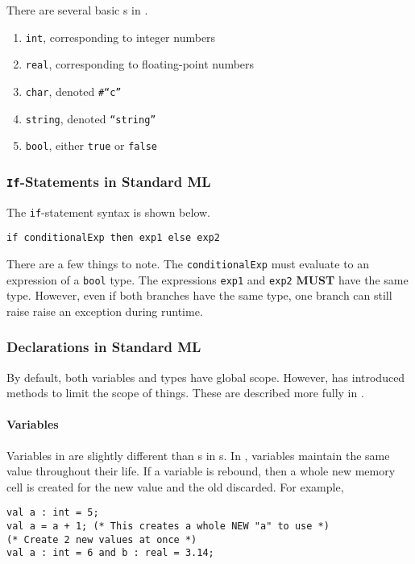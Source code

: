 There are several basic s in .
\begin{enumerate}[noitemsep]
\item \texttt{int}, corresponding to integer numbers
\item \texttt{real}, corresponding to floating-point numbers
\item \texttt{char}, denoted \texttt{\#``c''}
\item \texttt{string}, denoted \texttt{``string''}
\item \texttt{bool}, either \texttt{true} or \texttt{false}
\end{enumerate}

\subsubsection{\texttt{If}-Statements in Standard ML}\label{subsubsec:Functional-SML-If_Statement}
The \texttt{if}-statement syntax is shown below.
\begin{verbatim}
if conditionalExp then exp1 else exp2
\end{verbatim}

There are a few things to note.
The \texttt{conditionalExp} must evaluate to an expression of a \texttt{bool} type.
The expressions \texttt{exp1} and \texttt{exp2} \textbf{MUST} have the same type.
However, even if both branches have the same type, one branch can still raise raise an exception during runtime.

\subsubsection{Declarations in Standard ML}\label{subsubsec:Functional-SML-Declarations}
By default, both variables and types have global scope.
However,  has introduced methods to limit the scope of things.
These are described more fully in .

\paragraph{Variables}\label{par:Functional-SML-Variable_Declarations}
Variables in  are slightly different than s in s.
In , variables maintain the same value throughout their life.
If a variable is rebound, then a whole new memory cell is created for the new value and the old discarded.
For example,
\begin{verbatim}
val a : int = 5;
val a = a + 1; (* This creates a whole NEW "a" to use *)
(* Create 2 new values at once *)
val a : int = 6 and b : real = 3.14;
\end{verbatim}

